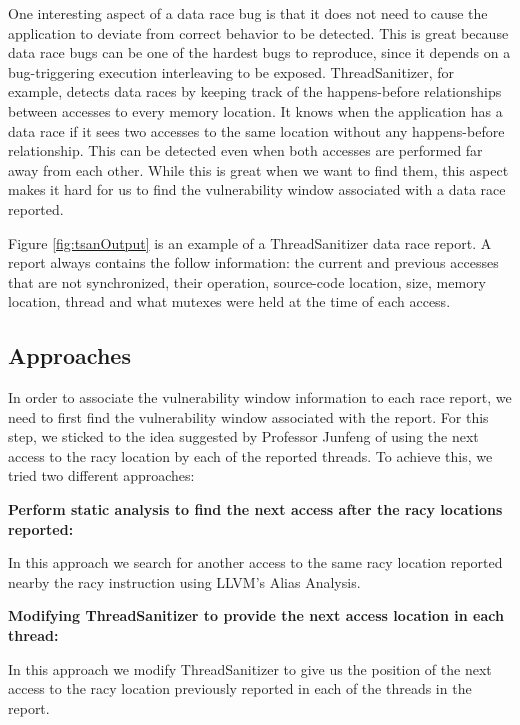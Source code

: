 \documentclass{acm_proc_article-sp}
\begin{document}
One interesting aspect of a data race bug is that it does not need to cause the application to deviate from correct behavior to be detected. This is great because data race bugs can be one of the hardest bugs to reproduce, since it depends on a bug-triggering execution interleaving to be exposed. ThreadSanitizer, for example, detects data races by keeping track of the happens-before relationships between accesses to every memory location. It knows when the application has a data race if it sees two accesses to the same location without any happens-before relationship. This can be detected even when both accesses are performed far away from each other. While this is great when we want to find them, this aspect makes it hard for us to find the vulnerability window associated with a data race reported.

Figure \ref{fig:tsanOutput} is an example of a ThreadSanitizer data race report. A report always contains the follow information: the current and previous accesses that are not synchronized, their operation, source-code location, size, memory location, thread and what mutexes were held at the time of each access.

\begin{figure*}
\centering
{}
\caption{ThreadSanitizer output}
\label{fig:tsanOutput}
\end{figure*}

\subsection{Approaches}
In order to associate the vulnerability window information to each race report, we need to first find the vulnerability window associated with the report. For this step, we sticked to the idea suggested by Professor Junfeng of using the next access to the racy location by each of the reported threads. To achieve this, we tried two different approaches: 

\textbf{Perform static analysis to find the next access after the racy locations reported:}

In this approach we search for another access to the same racy location reported nearby the racy instruction using LLVM's Alias Analysis.

\textbf{Modifying ThreadSanitizer to provide the next access location in each thread:}

In this approach we modify ThreadSanitizer to give us the position of the next access to the racy location previously reported in each of the threads in the report.
\end{document}

